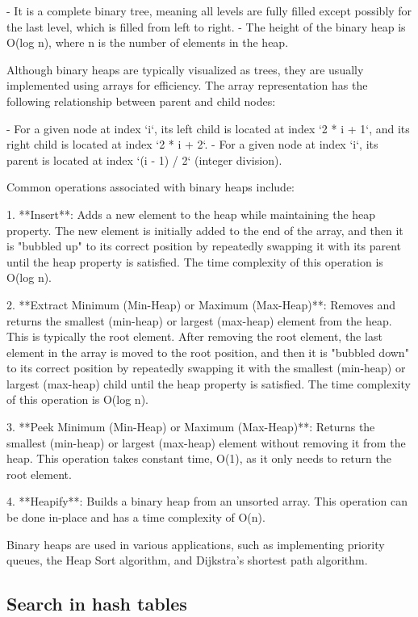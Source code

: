 \documentclass{article}
\begin{document}
- It is a complete binary tree, meaning all levels are fully filled except possibly for the last level, which is filled from left to right.
- The height of the binary heap is O(log n), where n is the number of elements in the heap.

Although binary heaps are typically visualized as trees, they are usually implemented using arrays for efficiency. The array representation has the following relationship between parent and child nodes:

- For a given node at index `i`, its left child is located at index `2 * i + 1`, and its right child is located at index `2 * i + 2`.
- For a given node at index `i`, its parent is located at index `(i - 1) / 2` (integer division).

Common operations associated with binary heaps include:

1. **Insert**: Adds a new element to the heap while maintaining the heap property. The new element is initially added to the end of the array, and then it is "bubbled up" to its correct position by repeatedly swapping it with its parent until the heap property is satisfied. The time complexity of this operation is O(log n).

2. **Extract Minimum (Min-Heap) or Maximum (Max-Heap)**: Removes and returns the smallest (min-heap) or largest (max-heap) element from the heap. This is typically the root element. After removing the root element, the last element in the array is moved to the root position, and then it is "bubbled down" to its correct position by repeatedly swapping it with the smallest (min-heap) or largest (max-heap) child until the heap property is satisfied. The time complexity of this operation is O(log n).

3. **Peek Minimum (Min-Heap) or Maximum (Max-Heap)**: Returns the smallest (min-heap) or largest (max-heap) element without removing it from the heap. This operation takes constant time, O(1), as it only needs to return the root element.

4. **Heapify**: Builds a binary heap from an unsorted array. This operation can be done in-place and has a time complexity of O(n).

Binary heaps are used in various applications, such as implementing priority queues, the Heap Sort algorithm, and Dijkstra's shortest path algorithm.


\subsection{Search in hash tables}
\end{document}
